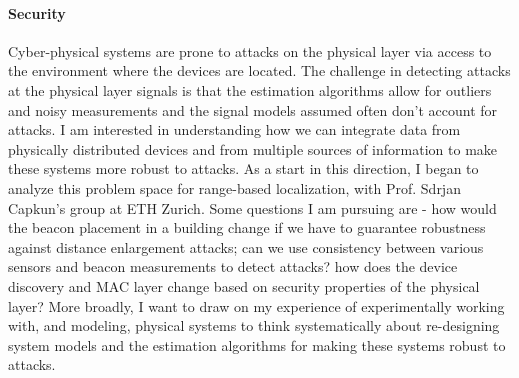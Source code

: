 \documentclass[10pt]{article}
\begin{document}
\paragraph{Security}


Cyber-physical systems are prone to attacks on the physical layer via
access to the environment where the devices are located.  The challenge in detecting attacks at the physical layer signals is that %
the estimation algorithms allow for
outliers and noisy measurements and the signal models assumed often don't
account for attacks. 
I am interested in understanding how we can integrate
data from physically distributed devices and from multiple sources of
information to make these systems more robust to attacks. As a start
in this direction, I began to analyze this problem space for
range-based localization, with Prof. Sdrjan Capkun's group at ETH
Zurich. 
Some questions I
am pursuing are - how would the beacon placement in a building change
if we have to guarantee robustness against distance enlargement attacks; can we use
consistency between various sensors and beacon measurements to detect attacks? 
how does the device discovery and MAC layer change based on security
properties of the physical layer? More broadly, I want to draw on my experience of experimentally
working with, and modeling, physical systems to think systematically
about re-designing system models and the estimation algorithms for
making these systems robust to attacks. %
\end{document}
